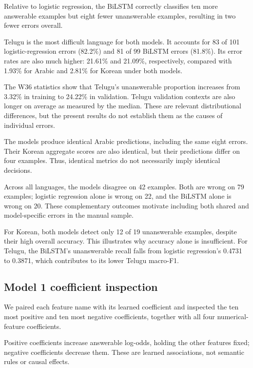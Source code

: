\documentclass[11pt,a4paper]{article}
\begin{document}
Relative to logistic regression, the BiLSTM correctly classifies ten
more answerable examples but eight fewer unanswerable examples,
resulting in two fewer errors overall.

Telugu is the most difficult language for both models. It accounts for
83 of 101 logistic-regression errors (82.2\%) and 81 of 99 BiLSTM errors
(81.8\%). Its error rates are also much higher: 21.61\% and 21.09\%,
respectively, compared with 1.93\% for Arabic and 2.81\% for Korean
under both models.

The W36 statistics show that Telugu's unanswerable proportion increases
from 3.32\% in training to 24.22\% in validation. Telugu validation
contexts are also longer on average as measured by the median.
These are relevant distributional differences, but the present results
do not establish them as the causes of individual errors.

The models produce identical Arabic predictions, including the same
eight errors. Their Korean aggregate scores are also identical, but
their predictions differ on four examples. Thus, identical metrics
do not necessarily imply identical decisions.

Across all languages, the models disagree on 42 examples. Both are
wrong on 79 examples; logistic regression alone is wrong on 22, and
the BiLSTM alone is wrong on 20. These complementary outcomes motivate
including both shared and model-specific errors in the manual sample.

For Korean, both models detect only 12 of 19 unanswerable examples,
despite their high overall accuracy. This illustrates why accuracy
alone is insufficient. For Telugu, the BiLSTM's unanswerable recall
falls from logistic regression's 0.4731 to 0.3871, which contributes
to its lower Telugu macro-F1.


\subsection{Model 1 coefficient inspection}

We paired each feature name with its learned coefficient and inspected
the ten most positive and ten most negative coefficients, together
with all four numerical-feature coefficients.

Positive coefficients increase answerable log-odds, holding the other
features fixed; negative coefficients decrease them. These are learned
associations, not semantic rules or causal effects.
\end{document}
